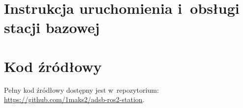 \chapter{Instrukcja uruchomienia i~obsługi stacji bazowej}
\label{app:instrukcja}

\chapter{Kod źródłowy}
\label{app:kod}

Pełny kod źródłowy dostępny jest w~repozytorium:
\url{https://github.com/1maks2/adsb-ros2-station}.

